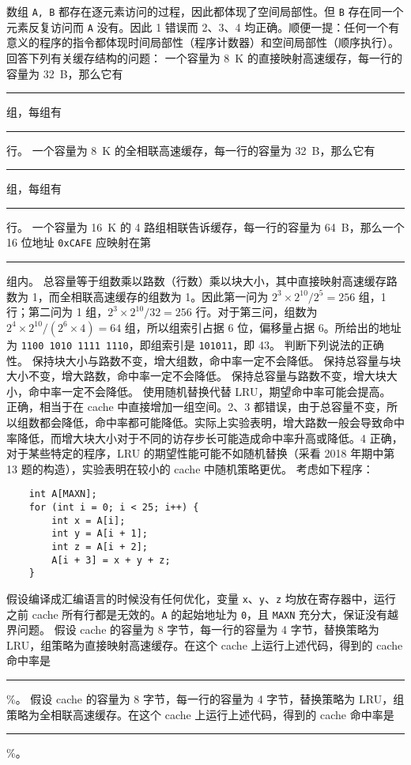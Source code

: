 \begin{problems}
        \sol 数组 \verb|A, B| 都存在逐元素访问的过程，因此都体现了空间局部性。但 \verb|B| 存在同一个元素反复访问而 \verb|A| 没有。因此 1 错误而 2、3、4 均正确。顺便一提：任何一个有意义的程序的指令都体现时间局部性（程序计数器）和空间局部性（顺序执行）。
        \pro 回答下列有关缓存结构的问题：
            \qn 一个容量为 \SI{8}{K} 的直接映射高速缓存，每一行的容量为 \SI{32}{B}，那么它有 \rule{2.5cm}{0.25mm} 组，每组有 \rule{2.5cm}{0.25mm} 行。
            \qn 一个容量为 \SI{8}{K} 的全相联高速缓存，每一行的容量为 \SI{32}{B}，那么它有 \rule{2.5cm}{0.25mm} 组，每组有 \rule{2.5cm}{0.25mm} 行。
            \qn 一个容量为 \SI{16}{K} 的 4 路组相联告诉缓存，每一行的容量为 \SI{64}{B}，那么一个 16 位地址 \verb|0xCAFE| 应映射在第 \rule{2.5cm}{0.25mm} 组内。
        \sol 总容量等于组数乘以路数（行数）乘以块大小，其中直接映射高速缓存路数为 1，而全相联高速缓存的组数为 1。因此第一问为 $2^3 \times 2^10/2^5=256$ 组，1 行；第二问为 1 组，$2^3 \times 2^10/32=256$ 行。对于第三问，组数为 $2^4 \times 2^10/(2^6 \times 4)=64$ 组，所以组索引占据 6 位，偏移量占据 6。所给出的地址为 \verb|1100 1010 1111 1110|，即组索引是 \verb|101011|，即 43。
        \pro 判断下列说法的正确性。
            \qn 保持块大小与路数不变，增大组数，命中率一定不会降低。
            \qn 保持总容量与块大小不变，增大路数，命中率一定不会降低。
            \qn 保持总容量与路数不变，增大块大小，命中率一定不会降低。
            \qn 使用随机替换代替 LRU，期望命中率可能会提高。
         正确，相当于在 cache 中直接增加一组空间。2、3 都错误，由于总容量不变，所以组数都会降低，命中率都可能降低。实际上实验表明，增大路数一般会导致命中率降低，而增大块大小对于不同的访存步长可能造成命中率升高或降低。4 正确，对于某些特定的程序，LRU 的期望性能可能不如随机替换（采看 2018 年期中第 13 题的构造），实验表明在较小的 cache 中随机策略更优。
        \pro 考虑如下程序：
        \begin{verbatim}
    int A[MAXN];
    for (int i = 0; i < 25; i++) {
        int x = A[i];
        int y = A[i + 1];
        int z = A[i + 2];
        A[i + 3] = x + y + z;
    }
        \end{verbatim}
        假设编译成汇编语言的时候没有任何优化，变量 \verb|x|、\verb|y|、\verb|z| 均放在寄存器中，运行之前 cache 所有行都是无效的。\verb|A| 的起始地址为 \verb|0|，且 \verb|MAXN| 充分大，保证没有越界问题。
        \qn 假设 cache 的容量为 8 字节，每一行的容量为 4 字节，替换策略为 LRU，组策略为直接映射高速缓存。在这个 cache 上运行上述代码，得到的 cache 命中率是 \rule{2.5cm}{0.25mm}\%。
        \qn 假设 cache 的容量为 8 字节，每一行的容量为 4 字节，替换策略为 LRU，组策略为全相联高速缓存。在这个 cache 上运行上述代码，得到的 cache 命中率是 \rule{2.5cm}{0.25mm}\%。

\end{problems}
